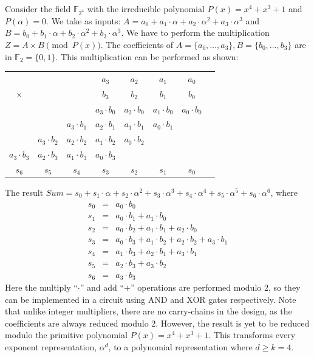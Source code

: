 \begin{Example}
\label{exp:mul}
Consider the field $\mathbb{F}_{2^4}$ with the irreducible polynomial 
$P(x)=x^4+x^3+1$ and $P(\alpha)=0$. We take as inputs:
$A=a_0+a_1\cdot \alpha+a_2\cdot \alpha^2+a_3\cdot \alpha^3$ and
$B=b_0+b_1\cdot \alpha+b_2\cdot \alpha^2+b_3\cdot \alpha^3$. 
We have to perform the multiplication $Z =A\times B \pmod{ P(x) }$. The coefficients
of $A = \{a_0, \dots, a_3\}, B = \{b_0, \dots, b_3\}$ are in
$\mathbb{F}_2 = \{0, 1\}$. This multiplication can be performed as
shown:

{\begin{tabular}{c c c c c c c c}
  &   &   & $a_3$ & $a_2$ & $a_1$ & $a_0$  \\ 
 $\times$&   &   & $b_3$ & $b_2$ & $b_1$ & $b_0$  \\ 
 \hline
 &   &   & $a_3\cdot b_0$ & $a_2 \cdot b_0$ & $a_1\cdot b_0$ & $a_0\cdot b_0$ \\
 &  & $a_3\cdot b_1$ & $a_2\cdot b_1$ & $a_1 \cdot b_1$ & $a_0\cdot b_1$ &   \\
 & $a_3\cdot b_2$ & $a_2\cdot b_2$ & $a_1\cdot b_2$ & $a_0\cdot b_2$ &  &   \\
 $a_3\cdot b_3$ & $a_2\cdot b_3$ & $a_1\cdot b_3$ & $a_0\cdot b_3$ &  &  &   \\
 \hline
 $s_6$& $s_5$  & $s_4$  & $s_3$ & $s_2$  & $s_1$   & $s_0$ 
\end{tabular}}

The result $Sum = s_0+s_1\cdot \alpha + s_2\cdot \alpha^2 + s_3\cdot
\alpha^3 + s_4\cdot \alpha^4 + s_5\cdot \alpha^5 + s_6\cdot \alpha^6$,
where
\begin{eqnarray}
	s_0  &=&  a_0\cdot b_0 \nonumber \\ 
	s_1  &=&  a_0\cdot b_1 + a_1\cdot b_0 \nonumber \\
	s_2  &=&  a_0\cdot b_2 + a_1\cdot b_1 + a_2\cdot b_0 \nonumber \\
	s_3  &=&  a_0\cdot b_3 + a_1\cdot b_2 + a_2\cdot b_2 +  a_3\cdot b_1\nonumber \\
	s_4  &=&  a_1\cdot  b_3 + a_2\cdot b_1 + a_3\cdot b_1 \nonumber \\
	s_5  &=&  a_2\cdot b_3 + a_3\cdot b_2  \nonumber \\
	s_6  &=&  a_3\cdot b_3   \nonumber
\end{eqnarray}
 Here the multiply ``$\cdot$'' and add ``$+$'' operations are performed
modulo 2, so they can be implemented in a circuit using AND and XOR
gates respectively. Note that unlike integer multipliers, there are no carry-chains
in the design, as the coefficients are always reduced modulo $2$. 
However, the result is yet to be reduced modulo the primitive
polynomial $P(x) = x^4 + x^3 + 1$. This transforms every exponent representation, 
$\alpha^d$, to a polynomial representation where $d\geq k=4$.


\end{Example}
